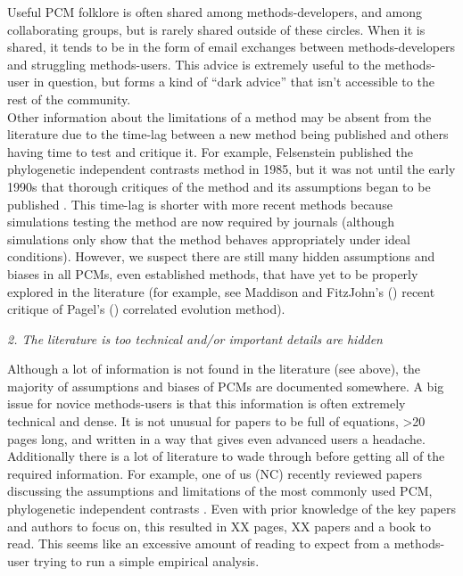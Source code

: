 \documentclass[a4paper,12pt]{article}
\renewcommand{\subsection}[1]{
  \bigskip
  \begin{center}
  \begin{large}
  \normalfont\itshape #1
  \end{large}
  \end{center}
}
\begin{document}
    Useful PCM folklore is often shared among methods-developers, and among collaborating groups, but is rarely shared outside of these circles. 
    When it is shared, it tends to be in the form of email exchanges between methods-developers and struggling methods-users.
    This advice is extremely useful to the methods-user in question, but forms a kind of ``dark advice'' that isn't accessible to the rest of the community.\\


    Other information about the limitations of a method may be absent from the literature due to the time-lag between a new method being published and others having time to test and critique it. 
    For example, Felsenstein published the phylogenetic independent contrasts method in 1985, but it was not until the early 1990s that thorough critiques of the method and its assumptions began to be published \citep[e.g.][]{garland1992procedures}.
    This time-lag is shorter with more recent methods because simulations testing the method are now required by journals (although simulations only show that the method behaves appropriately under ideal conditions).
    However, we suspect there are still many hidden assumptions and biases in all PCMs, even established methods, that have yet to be properly explored in the literature (for example, see Maddison and FitzJohn's (\citeyear{maddison2014unsolved}) recent critique of Pagel's (\citeyear{pagel1994detecting}) correlated evolution method).

\subsection{2. The literature is too technical and/or important details are hidden}
Although a lot of information is not found in the literature (see above), the majority of assumptions and biases of PCMs are documented somewhere. 
A big issue for novice methods-users is that this information is often extremely technical and dense.
It is not unusual for papers to be full of equations, \textgreater 20 pages long, and written in a way that gives even advanced users a headache. 
Additionally there is a lot of literature to wade through before getting all of the required information. 
For example, one of us (NC) recently reviewed papers discussing the assumptions and limitations of the most commonly used PCM, phylogenetic independent contrasts \citep{felsenstein1985phylogenies}. 
Even with prior knowledge of the key papers and authors to focus on, this resulted in XX pages, XX papers and a book to read. %
This seems like an excessive amount of reading to expect from a methods-user trying to run a simple empirical analysis.\\
\end{document}

